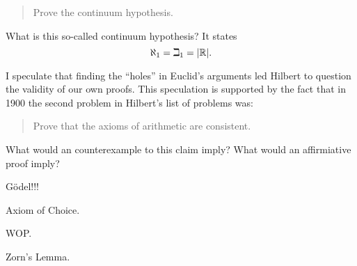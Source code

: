 \documentclass{ximera}
\begin{document}
\begin{quote}
Prove the continuum hypothesis.
\end{quote}

What is this so-called continuum hypothesis? It states
\[
\aleph_1 = \beth_1 = |\mathbb{R}|.
\]

I speculate that finding the ``holes'' in Euclid's arguments led
Hilbert to question the validity of our own proofs. This speculation
is supported by the fact that in 1900 the second problem in Hilbert's
list of problems was:
\begin{quote}
Prove that the axioms of arithmetic are consistent.
\end{quote}

\begin{question}
What would an counterexample to this claim imply? What would an
affirmiative proof imply?
\end{question}


G\"odel!!!

Axiom of Choice.

WOP.

Zorn's Lemma.
\end{document}
